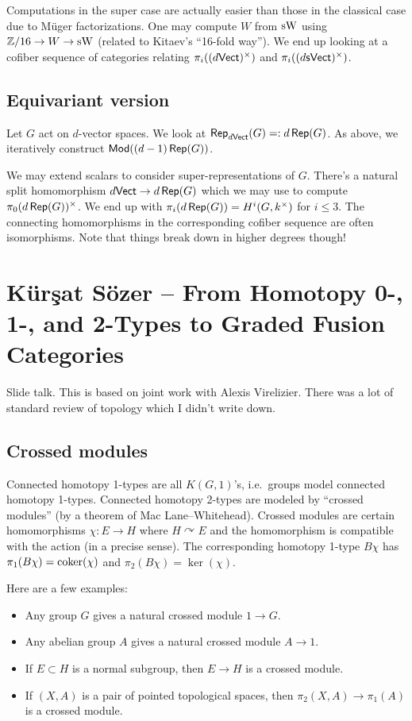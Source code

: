 \documentclass{amsart}
\begin{document}
Computations in the super case are actually easier than those in the classical case due to M\"uger factorizations.
One may compute $W$ from $\operatorname{sW}$ using $\mathbb{Z}/16 \to W \to \operatorname{sW}$ (related to Kitaev's ``16-fold way'').
We end up looking at a cofiber sequence of categories  relating $\pi_i((d\mathsf{Vect})^\times)$ and $\pi_i((d\mathsf{sVect})^\times)$.

\subsection{Equivariant version}

Let $G$ act on $d$-vector spaces.
We look at $\operatorname{\mathsf{Rep}}_{d\mathsf{Vect}}(G) =: d\operatorname{\mathsf{Rep}}(G)$.
As above, we iteratively construct $\mathsf{Mod}((d-1)\operatorname{\mathsf{Rep}}(G))$.

We may extend scalars to consider super-representations of $G$.
There's a natural split homomorphism $d\mathsf{Vect} \to d\operatorname{\mathsf{Rep}}(G)$ which we may use to compute $\pi_0(d\operatorname{\mathsf{Rep}}(G))^\times$.
We end up with $\pi_i(d\operatorname{\mathsf{Rep}}(G)) = H^i(G, k^\times)$ for $i \leq 3$.
The connecting homomorphisms in the corresponding cofiber sequence are often isomorphisms.
Note that things break down in higher degrees though!

\section{K\"ur\c{s}at S\"ozer -- From Homotopy 0-, 1-, and 2-Types to Graded Fusion Categories}

Slide talk.
This is based on joint work with Alexis Virelizier.
There was a lot of standard review of topology which I didn't write down.

\subsection{Crossed modules}

Connected homotopy 1-types are all $K(G, 1)$'s, i.e.\ groups model connected homotopy 1-types.
Connected homotopy 2-types are modeled by ``crossed modules'' (by a theorem of Mac Lane--Whitehead).
Crossed modules are certain homomorphisms $\chi: E \to H$ where $H \curvearrowright E$ and the homomorphism is compatible with the action (in a precise sense).
The corresponding homotopy 1-type $B\chi$ has $\pi_1(B\chi) = \operatorname{coker}(\chi)$ and $\pi_2(B\chi) = \ker(\chi)$.

Here are a few examples:
\begin{itemize}
  \item Any group $G$ gives a natural crossed module $1 \to G$.
  \item Any abelian group $A$ gives a natural crossed module $A \to 1$.
  \item If $E \subset H$ is a normal subgroup, then $E \to H$ is a crossed module.
  \item If $(X, A)$ is a pair of pointed topological spaces, then $\pi_2(X, A) \to \pi_1(A)$ is a crossed module.
\end{itemize}
\end{document}
